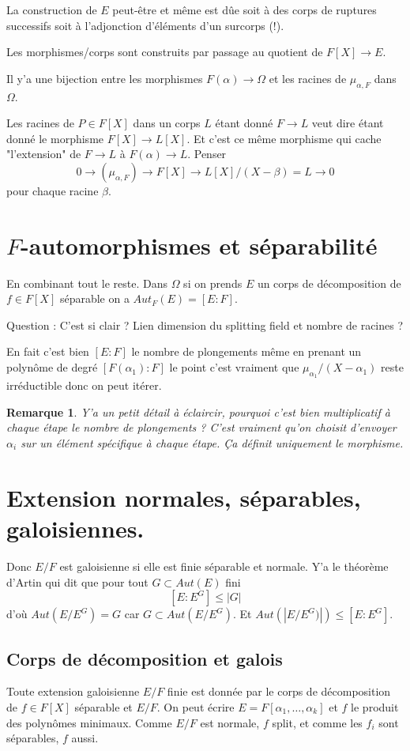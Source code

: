 \documentclass[a4paper,12pt]{book}
\theoremstyle{plain}
\newtheorem{rem}{Remarque}
\theoremstyle{definition}
\theoremstyle{remark}
\begin{document}
La construction de $E$ peut-être et même est dûe soit à des corps
de ruptures successifs soit à l'adjonction d'éléments d'un 
surcorps (!).

Les morphismes/corps sont construits par passage au quotient de
$F[X]\to E$.

Il y'a une bijection entre les morphismes $F(\alpha)\to \Omega$
et les racines de $\mu_{\alpha,F}$ dans $\Omega$.

Les racines de $P\in F[X]$ dans un corps $L$ étant donné $F\to L$
veut dire étant donné le morphisme $F[X]\to L[X]$. Et c'est ce 
même morphisme qui cache "l'extension" de $F\to L$ à $F(\alpha)
\to L$. Penser 
\[0\to (\mu_{\alpha,F})\to F[X]\to L[X]/(X-\beta)=L\to 0\]
pour chaque racine $\beta$.

\section{$F$-automorphismes et séparabilité}
En combinant tout le reste. Dans $\Omega$ si on prends 
$E$ un corps de décomposition de $f\in F[X]$ séparable on a
$Aut_F(E)=[E:F]$.

Question : C'est si clair ? Lien dimension du splitting field et
nombre de racines ?

\noindent En fait c'est bien $[E:F]$ le nombre de plongements même
en prenant un polynôme de degré $[F(\alpha_1):F]$ le point c'est
vraiment que $\mu_{\alpha_1}/(X-\alpha_1)$ reste irréductible donc
on peut itérer.

\begin{rem}
  Y'a un petit détail à éclaircir, pourquoi c'est bien 
  multiplicatif à chaque étape le nombre de plongements ? C'est
  vraiment qu'on choisit d'envoyer $\alpha_i$ sur un élément
  spécifique à chaque étape. Ça définit uniquement le morphisme.
\end{rem}

\section{Extension normales, séparables, galoisiennes.}
Donc $E/F$ est galoisienne si elle est finie séparable et normale.
Y'a le théorème d'Artin qui dit que pour tout $G\subset Aut(E)$
fini
\[[E:E^G]\leq |G|\]
d'où $Aut(E/E^G)=G$ car $G\subset Aut(E/E^G)$. Et 
$Aut(|E/E^G)|)\leq [E:E^G]$. 
\subsection{Corps de décomposition et galois}
Toute extension galoisienne $E/F$ finie est donnée par le corps
de décomposition de $f\in F[X]$ séparable et $E/F$. On peut écrire
$E=F[\alpha_1,\ldots,\alpha_k]$ et $f$ le produit des polynômes
minimaux. Comme $E/F$ est normale, $f$ split, et comme les $f_i$
sont séparables, $f$ aussi. 
\end{document}
